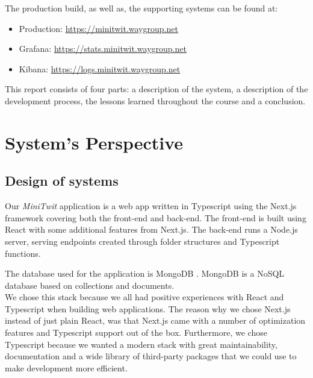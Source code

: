\documentclass{article}
\begin{document}
The production build, as well as, the supporting systems can be found at: 
\begin{itemize}
    \item Production: \href{https://minitwit.waygroup.net/}{https://minitwit.waygroup.net}
    \item Grafana: \href{https://stats.minitwit.waygroup.net}{https://stats.minitwit.waygroup.net}
    \item Kibana: \href{https://logs.minitwit.waygroup.net}{https://logs.minitwit.waygroup.net}
\end{itemize}

This report consists of four parts: a description of the system, a description of the development process, the lessons learned throughout the course and a conclusion.

\newpage
\section{System's Perspective}
\subsection{Design of systems}
Our \textit{MiniTwit} application is a web app written in Typescript using the Next.js framework covering both the front-end and back-end. The front-end is built using React with some additional features from Next.js. The back-end runs a Node.js server, serving endpoints created through folder structures and Typescript functions.

The database used for the application is MongoDB \cite{mongodb}. MongoDB is a NoSQL \cite{nosql} database based on collections and documents.\\

We chose this stack because we all had positive experiences with React and Typescript when building web applications. The reason why we chose Next.js instead of just plain React, was that Next.js came with a number of optimization features and Typescript support out of the box. Furthermore, we chose Typescript because we wanted a modern stack with great maintainability, documentation and a wide library of third-party packages that we could use to make development more efficient.
\end{document}
